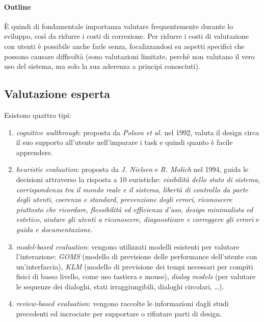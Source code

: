 \paragraph{Outline}
\`E quindi di fondamentale importanza valutare frequentemente durante lo sviluppo, cos\`i da ridurre i costi di correzione. Per ridurre i costi di valutazione con utenti \`e possibile anche farle senza, focalizzandosi su aspetti specifici che possono causare difficolt\`a (sono valutazioni limitate, perch\`e non valutano il vero uso del sistema, ma solo la sua aderenza a principi conosciuti).

\subsection{Valutazione esperta}
Esistono quattro tipi:
\begin{enumerate}
	\item \textit{cognitive walthrough}: proposta da \textit{Polson et al.} nel 1992, valuta il design circa il suo supporto all'utente nell'imparare i task e quindi quanto \`e facile apprendere.
	\item \textit{heuristic evaluation}: proposta da \textit{J. Nielsen} e \textit{R. Molich} nel 1994, guida le decisioni attraverso la risposta a 10 euristiche: \textit{visibilit\`a dello stato di sistema}, \textit{corrispondenza tra il mondo reale e il sistema}, \textit{libert\`a di controllo da parte degli utenti}, \textit{coerenza e standard}, \textit{prevenzione degli errori}, \textit{riconoscere piuttosto che ricordare}, \textit{flessibilit\`a ed efficienza d'uso}, \textit{design minimalista ed estetico}, \textit{aiutare gli utenti a riconoscere, diagnosticare e correggere gli errori} e \textit{guida e documentazione}.
	\item \textit{model-based evaluation}: vengono utilizzati modelli esistenti per valutare l'interazione: \textit{GOMS} (modello di previsione delle performance dell'utente con un'interfaccia), \textit{KLM} (modello di previsione dei tempi necessari per compiti fisici di basso livello, come uso tastiera e mouse), \textit{dialog models} (per valutare le sequenze dei dialoghi, stati irraggiungibili, dialoghi circolari, \ldots).
	\item \textit{review-based evaluation}: vengono raccolte le informazioni dagli studi precedenti ed incrociate per supportare o rifiutare parti di design.
\end{enumerate}
